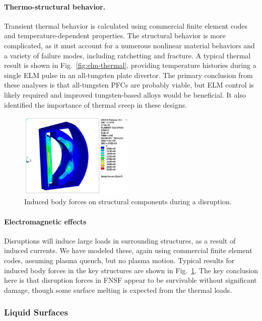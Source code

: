 \paragraph{Thermo-structural behavior.} Transient thermal behavior is
calculated using commercial finite element codes and temperature-dependent
properties. The structural behavior is more complicated, as it must account
for a numerous nonlinear material behaviors and a variety of failure modes,
including ratchetting and fracture. A typical thermal result is shown in
Fig.\ \ref{fig:elm-thermal}, providing temperature histories during a single
\gls{ELM} pulse in an all-tungsten plate divertor. The primary conclusion from
these analyses is that all-tungsten \glspl{PFC} are probably viable, but
\gls{ELM} control is likely required and improved tungsten-based alloys would
be beneficial. It also identified the importance of thermal creep in these
designs.

\begin{figure}
\centering
\includegraphics[width=0.48\textwidth]{imgs/disrupt-em.png}
\caption{\label{fig:disrupt-em}Induced body forces on structural components during a disruption.}
\end{figure}

\paragraph{Electromagnetic effects} Disruptions will induce large loads in
surrounding structures, as a result of induced currents. We have modeled
these, again using commercial finite element codes, assuming plasma quench,
but no plasma motion. Typical results for induced body forces in the key
structures are shown in Fig.\ \ref{fig:disrupt-em}. The key conclusion here is
that disruption forces in FNSF appear to be survivable without significant
damage, though some surface melting is expected from the thermal loads.

\subsubsection{Liquid Surfaces}

